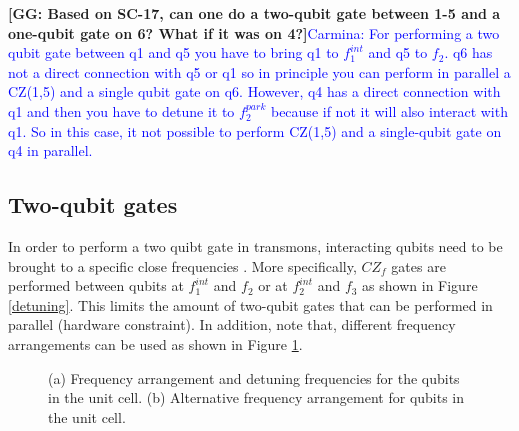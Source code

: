 \documentclass[11pt]{article}
\def\noteGG#1{\textbf{\color{red}[GG: #1]}}
\begin{document}
\noteGG{Based on SC-17, can one do a two-qubit gate between 1-5 and a one-qubit gate on 6? What if it was on 4?}\textcolor{blue}{Carmina: For performing a two qubit gate between q1 and q5 you have to bring q1 to $f^{int}_{1}$ and q5 to $f_2$. q6 has not a direct connection with q5 or q1 so in principle you can perform in parallel a CZ(1,5) and a single qubit gate on q6. However, q4 has a direct connection with q1 and then you have to detune it to $f^{park}_2$ because if not it will also interact with q1. So in this case, it not possible to perform CZ(1,5) and a single-qubit gate on q4 in parallel.  }

\subsection{Two-qubit gates}

In order to perform a two quibt gate in transmons, interacting qubits need to be brought to a specific close frequencies \cite{versluis2016scalable}. More specifically, $CZ_f$ gates are performed between qubits at $f^{int}_1$ and $f_2$ or at $f^{int}_2$ and $f_3$ as shown in Figure \ref{detuning}. This limits the amount of two-qubit gates that can be performed in parallel (hardware constraint). In addition, note that, different frequency arrangements can be used as shown in Figure \ref{sequence}. 


\begin{figure}[h!]
\centerline{
}
\caption{(a) Frequency arrangement and detuning frequencies for the qubits in the unit cell. (b) Alternative frequency arrangement for qubits in the unit cell.}
\label{sequence}
\end{figure}
\end{document}

